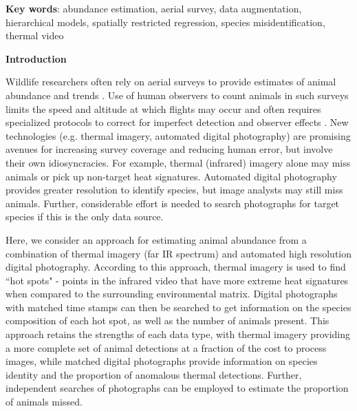 \documentclass[12pt,fleqn]{article}
\begin{document}
\begin{flushleft}
{\bf Key words}: abundance estimation, aerial survey, data augmentation, hierarchical models, spatially restricted regression, species misidentification, thermal video

\vspace{.5 in}


\setlength{\baselineskip}{24pt}


{\bf Introduction}

Wildlife researchers often rely on aerial surveys
to provide estimates of animal abundance and trends \citep{VerHoef2012}.  Use of human observers to count animals
in such surveys limits the speed and altitude at which flights
may occur and often requires specialized protocols to correct for imperfect detection and
observer effects \citep[e.g. double observer designs;][]{BorchersEtAl1998}.  New technologies (e.g. thermal imagery, automated digital photography) are promising avenues for increasing survey coverage
and reducing human error, but involve their own idiosyncracies.  For example, thermal (infrared) imagery alone may miss animals or pick up non-target heat signatures.  Automated digital photography provides greater resolution to identify species, but image analysts may still miss animals.  Further, considerable effort is needed to search photographs for target species if this is the only data source.

\hspace{.5in}Here, we consider an approach for estimating animal abundance from a combination of thermal imagery (far IR spectrum) and automated high resolution digital photography.  According to this approach, thermal imagery is used to find ``hot spots" - points in the infrared video that have more extreme heat signatures when compared to the surrounding environmental matrix.  Digital photographs with matched time stamps can then be searched to get information on the species composition of each hot spot, as well as the number of animals present.
This approach retains the strengths of each data type, with thermal
imagery providing a more complete set of animal detections at a fraction
of the cost to process images, while matched digital photographs provide information on species identity and the proportion of anomalous thermal detections.  Further, independent searches of photographs can be employed to estimate the proportion of animals missed.


\end{flushleft}
\end{document}
